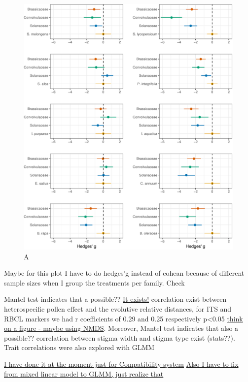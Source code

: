 \documentclass[11pt,a4paper]{article}
\begin{document}
\begin{figure}
\centering
\includegraphics{output/figures/unnamed-chunk-6-1.pdf}
\caption{A}
\end{figure}

Maybe for this plot I have to do hedges'g instead of cohean because of
different sample sizes when I group the treatments per family. Check

\newpage

Mantel test indicates that a possible?? \href{}{It exists!} correlation
exist between heterospecific pollen effect and the evolutive relative
distances, for ITS and RBCL markers we had r coefficients of 0.29 and
0.25 respectively p\textless{}0.05 \href{}{think on a figure - maybe
using NMDS}. Moreover, Mantel test indicates that also a possible??
correlation between stigma width and stigma type exist (stats??). Trait
correlations were also explored with GLMM

\href{Jose}{I have done it at the moment just for Compatibility system}
\href{Jose}{Also I have to fix from mixed linear model to GLMM, just
realize that}

\newpage
\end{document}
